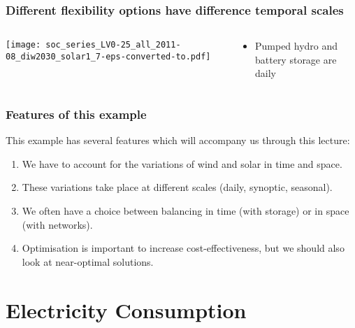 \documentclass[10pt,aspectratio=169,dvipsnames]{beamer}
\let\olditem\item
\renewcommand{\item}{%
\olditem\vspace{5pt}}
\begin{document}
\begin{frame}
  \frametitle{Different flexibility options have difference temporal scales}

\begin{columns}[T]
  \begin{column}{10.5cm}

    \vspace{0.5cm}
  \texttt{[image: soc\_series\_LV0-25\_all\_2011-08\_diw2030\_solar1\_7-eps-converted-to.pdf]}

  \end{column}

  \begin{column}{3cm}
        \vspace{2cm}
    \begin{itemize}
    \item Pumped hydro and battery storage are \alert{daily}
    \end{itemize}

  \end{column}

\end{columns}
\end{frame}


\begin{frame}
  \frametitle{Features of this example}

  This example has several features which will accompany us through this lecture:
  \begin{enumerate}
  \item We have to account for the variations of wind and solar in \alert{time} and \alert{space}.
  \item These variations take place at \alert{different scales} (daily, synoptic, seasonal).
  \item We often have a choice between balancing in \alert{time} (with storage) or in \alert{space} (with networks).
  \item Optimisation is important to increase cost-effectiveness, but
    we should also look at \alert{near-optimal} solutions.
  \end{enumerate}

\end{frame}


\section{Electricity Consumption}
\end{document}
